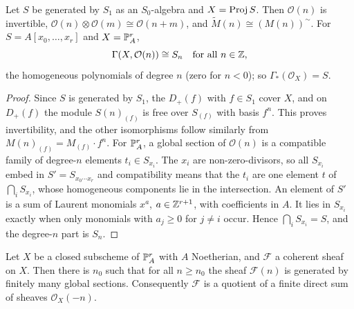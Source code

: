 \begin{proposition}\label{coherent-sheaves:proposition-twisting}
Let $S$ be generated by $S_1$ as an $S_0$-algebra and $X = \operatorname{Proj} S$. Then $\mathcal{O}(n)$ is invertible, $\mathcal{O}(n) \otimes \mathcal{O}(m) \cong \mathcal{O}(n+m)$, and
$\widetilde M(n) \cong (M(n))^\sim$. For $S = A[x_0, \ldots, x_r]$ and $X = \mathbb{P}^r_A$,
\[
\Gamma(X, \mathcal{O}(n)) \cong S_n \quad \text{for all } n \in \mathbb{Z},
\]
the homogeneous polynomials of degree $n$ (zero for $n < 0$); so $\Gamma_*(\mathcal{O}_X) = S$.
\end{proposition}

\begin{proof}
Since $S$ is generated by $S_1$, the $D_+(f)$ with $f \in S_1$ cover $X$, and on $D_+(f)$ the module $S(n)_{(f)}$ is free over $S_{(f)}$ with basis $f^n$. This
proves invertibility, and the other isomorphisms follow similarly from $M(n)_{(f)} = M_{(f)} \cdot f^n$. For $\mathbb{P}^r_A$, a global section of $\mathcal{O}(n)$ is a
compatible family of degree-$n$ elements $t_i \in S_{x_i}$. The $x_i$ are non-zero-divisors, so all $S_{x_i}$ embed in $S' = S_{x_0 \cdots x_r}$ and compatibility
means that the $t_i$ are one element $t$ of $\bigcap_iS_{x_i}$, whose homogeneous components lie in the intersection. An element of $S'$ is a sum of Laurent
monomials $x^a$, $a \in \mathbb{Z}^{r+1}$, with coefficients in $A$. It lies in $S_{x_i}$ exactly when only monomials with $a_j \geq 0$ for $j \neq i$ occur. Hence
$\bigcap_iS_{x_i} = S$, and the degree-$n$ part is $S_n$.
\end{proof}

\begin{theorem}[Serre]\label{coherent-sheaves:theorem-serre-generation}
Let $X$ be a closed subscheme of $\mathbb{P}^r_A$ with $A$ Noetherian, and $\mathcal{F}$ a coherent sheaf on $X$. Then there is $n_0$ such that for all $n \geq n_0$ the
sheaf $\mathcal{F}(n)$ is generated by finitely many global sections. Consequently $\mathcal{F}$ is a quotient of a finite direct sum of sheaves
$\mathcal{O}_X(-n)$.
\end{theorem}

